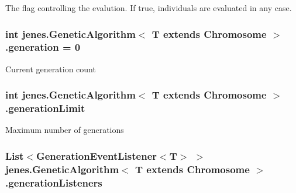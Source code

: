 The flag controlling the evalution. If true, individuals are evaluated in any case. \hypertarget{classjenes_1_1_genetic_algorithm_3_01_t_01extends_01_chromosome_01_4_ac5a1ddc5e78e2b81c754eb990a91f17b}{
\subsubsection[{generation}]{\setlength{\rightskip}{0pt plus 5cm}int jenes.\-Genetic\-Algorithm$<$ T extends Chromosome $>$.generation = 0\hspace{0.3cm}{\ttfamily [protected]}}}\label{classjenes_1_1_genetic_algorithm_3_01_t_01extends_01_chromosome_01_4_ac5a1ddc5e78e2b81c754eb990a91f17b}
Current generation count \hypertarget{classjenes_1_1_genetic_algorithm_3_01_t_01extends_01_chromosome_01_4_a6677c80cf6ad470a0124fc2fa3051310}{
\subsubsection[{generation\-Limit}]{\setlength{\rightskip}{0pt plus 5cm}int jenes.\-Genetic\-Algorithm$<$ T extends Chromosome $>$.generation\-Limit\hspace{0.3cm}{\ttfamily [protected]}}}\label{classjenes_1_1_genetic_algorithm_3_01_t_01extends_01_chromosome_01_4_a6677c80cf6ad470a0124fc2fa3051310}
Maximum number of generations \hypertarget{classjenes_1_1_genetic_algorithm_3_01_t_01extends_01_chromosome_01_4_a265c4e10d321e68ae5757abf68d88739}{
\subsubsection[{generation\-Listeners}]{\setlength{\rightskip}{0pt plus 5cm}List$<$Generation\-Event\-Listener$<$T$>$ $>$ jenes.\-Genetic\-Algorithm$<$ T extends Chromosome $>$.generation\-Listeners\hspace{0.3cm}{\ttfamily [protected]}}}\label{classjenes_1_1_genetic_algorithm_3_01_t_01extends_01_chromosome_01_4_a265c4e10d321e68ae5757abf68d88739}
